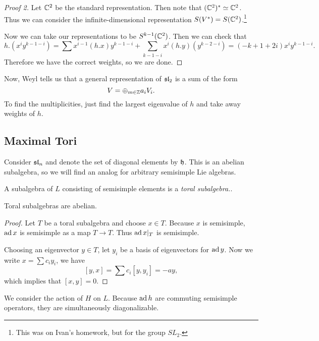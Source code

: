 \documentclass[twoside, 10pt]{article}
\begin{document}
    \begin{proof}[Proof 2]
        Let $\mathbb{C}^2$ be the standard representation. Then note that $(\mathbb{C}^2)^* \simeq \mathbb{C}^2$. Thus we can consider the infinite-dimensional representation $S(V^*) = S(\mathbb{C}^2)$.\footnote{This was on Ivan's homework, but for the group $SL_2$.}

        Now we can take our representations to be $S^{k-1}(\mathbb{C}^2)$. Then we can check that 
        \[h.(x^iy^{k-1-i}) = \sum x^{i-1}(h.x) y^{k-1-i} + \sum_{k-1-i}x^i(h.y)(y^{k-2-i}) = (-k+1+2i)x^iy^{k-1-i}.\]
        Therefore we have the correct weights, so we are done.
    \end{proof}

    Now, Weyl tells us that a general representation of $\mathfrak{sl}_2$ is a sum of the form
    \[ V = \oplus_{m \in \mathbb{Z}} a_iV_i.\] To find the multiplicities, just find the largest eigenvalue of $h$ and take away weights of $h$.

    \subsection{Maximal Tori}%
    \label{sub:maximal_tori}
    
    Consider $\mathfrak{sl}_n$ and denote the set of diagonal elements by $\mathfrak{h}$. This is an abelian subalgebra, so we will find an analog for arbitrary semisimple Lie algebras.

    \begin{defn}
        A subalgebra of $L$ consisting of semisimple elements is a \textit{toral subalgebra.}.
    \end{defn}

    \begin{thm}
        Toral subalgebras are abelian.
    \end{thm}

    \begin{proof}
        Let $T$ be a toral subalgebra and choose $x \in T$. Because $x$ is semisimple, $\operatorname{ad} x$ is semisimple as a map $T \to T$. Thus $\operatorname{ad} x|_T$ is semisimple. 

        Choosing an eigenvector $y \in T$, let $y_i$ be a basis of eigenvectors for $\operatorname{ad} y$. Now we write $x = \sum c_iy_i$, we have
        \[ [y,x] = \sum c_i [y,y_i] = -ay,\] which implies that $[x,y] = 0$.
    \end{proof}

    We consider the action of $H$ on $L$. Because $\operatorname{ad} h$ are commuting semisimple operators, they are simultaneously diagonalizable.
\end{document}
